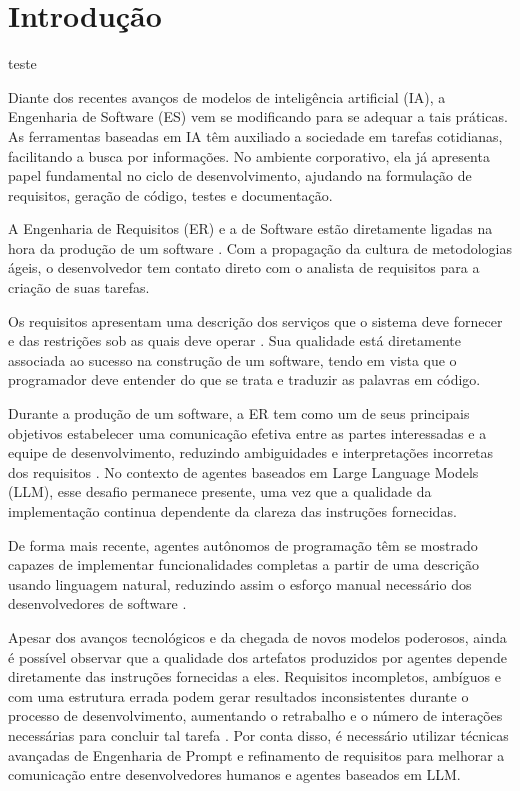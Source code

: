 \section{Introdução}

teste 

Diante dos recentes avanços de modelos de inteligência artificial (IA), a Engenharia de Software (ES) vem se modificando para se adequar a tais práticas. As ferramentas baseadas em IA têm auxiliado a sociedade em tarefas cotidianas, facilitando a busca por informações. No ambiente corporativo, ela já apresenta papel fundamental no ciclo de desenvolvimento, ajudando na formulação de requisitos, geração de código, testes e documentação.

A Engenharia de Requisitos (ER) e a de Software estão diretamente ligadas na hora da produção de um software \cite{sommerville_engenharia_nodate}. Com a propagação da cultura de metodologias ágeis, o desenvolvedor tem contato direto com o analista de requisitos para a criação de suas tarefas.

Os requisitos apresentam uma descrição dos serviços que o sistema deve fornecer e das restrições sob as quais deve operar \cite{sommerville_engenharia_nodate}. Sua qualidade está diretamente associada ao sucesso na construção de um software, tendo em vista que o programador deve entender do que se trata e traduzir as palavras em código.

Durante a produção de um software, a ER tem como um de seus principais objetivos estabelecer uma comunicação efetiva entre as partes interessadas e a equipe de desenvolvimento, reduzindo ambiguidades e interpretações incorretas dos requisitos \cite{sommerville_engenharia_nodate}. No contexto de agentes baseados em Large Language Models (LLM), esse desafio permanece presente, uma vez que a qualidade da implementação continua dependente da clareza das instruções fornecidas.

De forma mais recente, agentes autônomos de programação têm se mostrado capazes de implementar funcionalidades completas a partir de uma descrição usando linguagem natural, reduzindo assim o esforço manual necessário dos desenvolvedores de software \cite{ciudrowski2026explorando}.

Apesar dos avanços tecnológicos e da chegada de novos modelos poderosos, ainda é possível observar que a qualidade dos artefatos produzidos por agentes depende diretamente das instruções fornecidas a eles. Requisitos incompletos, ambíguos e com uma estrutura errada podem gerar resultados inconsistentes durante o processo de desenvolvimento, aumentando o retrabalho e o número de interações necessárias para concluir tal tarefa \cite{ciudrowski2026explorando}. Por conta disso, é necessário utilizar técnicas avançadas de Engenharia de Prompt e refinamento de requisitos para melhorar a comunicação entre desenvolvedores humanos e agentes baseados em LLM.

